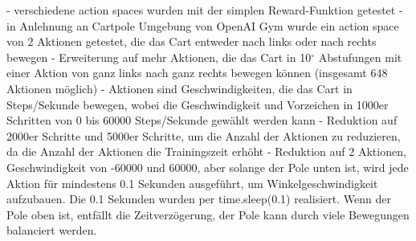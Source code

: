 - verschiedene action spaces wurden mit der simplen Reward-Funktion getestet
- in Anlehnung an Cartpole Umgebung von OpenAI Gym wurde ein action space von 2 Aktionen getestet, die das Cart entweder nach links oder nach rechts bewegen
- Erweiterung auf mehr Aktionen, die das Cart in 10$^\circ$ Abstufungen mit einer Aktion von ganz links nach ganz rechts bewegen können (insgesamt 648 Aktionen möglich)
- Aktionen sind Geschwindigkeiten, die das Cart in Steps/Sekunde bewegen, wobei die Geschwindigkeit und Vorzeichen in 1000er Schritten von 0 bis 60000 Steps/Sekunde gewählt werden kann
- Reduktion auf 2000er Schritte und 5000er Schritte, um die Anzahl der Aktionen zu reduzieren, da die Anzahl der Aktionen die Trainingszeit erhöht
- Reduktion auf 2 Aktionen, Geschwindigkeit von -60000 und 60000, aber solange der Pole unten ist, wird jede Aktion für mindestens 0.1 Sekunden ausgeführt, um Winkelgeschwindigkeit aufzubauen. Die 0.1 Sekunden wurden per time.sleep(0.1) realisiert. Wenn der Pole oben ist, entfällt die Zeitverzögerung, der Pole kann durch viele Bewegungen balanciert werden.

